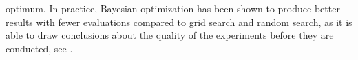 optimum. In practice, Bayesian optimization has been shown to produce better results with fewer evaluations compared to grid search and random search, as it is able to draw conclusions about the quality of the experiments before they are conducted, see \cite{SnoekLarochelleAdams:2012}.








